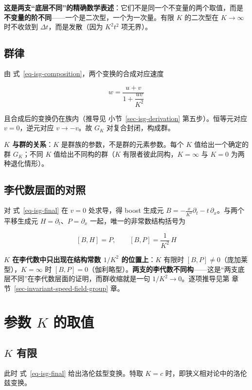 \documentclass[
  chinese,
  a4paper,
  UTF8,
  12pt,
  oneside,
  openany]{ctexbook}
\theoremstyle{plain}
\theoremstyle{plain}
\theoremstyle{plain}
\theoremstyle{definition}
\theoremstyle{plain}
\theoremstyle{plain}
\theoremstyle{remark}
\begin{document}
\textbf{这是两支``底层不同''的精确数学表述}：它们不是同一个不变量的两个取值，而是\textbf{不变量的阶不同}------一个是二次型，一个为一次量。有限
\(K\) 的二次型在 \(K\to\infty\) 时不收敛到 \(\Delta t\)，而是发散（因为
\(K^2t^2\) 项无界）。

\subsection{群律}\label{ux7fa4ux5f8b}

由 式~\ref{eq-isg-composition}，两个变换的合成对应速度

\[
w=\frac{u+v}{1+\dfrac{uv}{K^{2}}}
\]

且合成后的变换仍在族内（推导见 小节~\ref{sec-isg-derivation}
第五步）。恒等元对应 \(v=0\)，逆元对应 \(v\to-v\)。故 \(G_K\)
对复合封闭，构成群。

\textbf{\(K\) 与群的关系}：\(K\) 是群族的参数，不是群的元素参数。每个
\(K\) 值给出一个确定的群 \(G_K\)；不同 \(K\) 值给出不同构的群（\(K\)
有限者彼此同构，\(K=\infty\) 与 \(K=0\) 为两种退化情形）。

\subsection{李代数层面的对照}\label{sec-isg-lie}

对 式~\ref{eq-isg-final} 在 \(v=0\) 处求导，得 boost 生成元
\(B=-\frac{x}{K^{2}}\partial_t-t\,\partial_x\)。与两个平移生成元
\(H=\partial_t\)、\(P=\partial_x\) 一起，唯一的非常数结构括号为

\[
[B,H]=P,\qquad [B,P]=\frac{1}{K^{2}}\,H
\]

\textbf{\(K\) 在李代数中只出现在结构常数 \(1/K^{2}\) 的位置上}：\(K\)
有限时 \([B,P]\neq0\)（庞加莱型），\(K=\infty\) 时
\([B,P]=0\)（伽利略型）。\textbf{两支的李代数不同构}------这是``两支底层不同''在李代数层面的证明，而群收缩就是一句
\(1/K^{2}\to0\)。逐项推导见第 章节~\ref{sec-invariant-speed-field-group}
章。

\section{\texorpdfstring{参数 \(K\)
的取值}{参数 K 的取值}}\label{sec-isg-K}

\subsection{\texorpdfstring{\(K\) 有限}{K 有限}}\label{k-ux6709ux9650}

此时 式~\ref{eq-isg-final} 给出洛伦兹型变换。特取 \(K=c\)
时，即狭义相对论中的洛伦兹变换。
\end{document}
